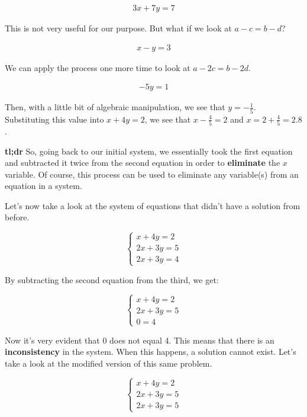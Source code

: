 \documentclass{scrbook}
\theoremstyle{definition}
\begin{document}
\begin{align*}
  3x + 7y = 7
\end{align*}

This is not very useful for our purpose. But what if we look at $a - c = b - d$?

\begin{align*}
  x - y = 3
\end{align*}

We can apply the process one more time to look at $a - 2c = b - 2d$. 

\begin{align*}
  - 5y = 1
\end{align*}

Then, with a little bit of algebraic manipulation, we see that $y = -\frac{1}{5}$. Substituting this value into $x + 4y = 2$, we see that $x - \frac{4}{5} = 2$ and $x = 2 + \frac{4}{5} = 2.8$. 

\textbf{tl;dr} So, going back to our initial system, we essentially took the first equation and subtracted it twice from the second equation in order to \textbf{eliminate} the $x$ variable. Of course, this process can be used to eliminate any variable(s) from an equation in a system. 

Let's now take a look at the system of equations that didn't have a solution from before.

\[
  \begin{cases}
    x + 4y = 2\\
    2x + 3y = 5\\
    2x + 3y = 4
  \end{cases}
\]

By subtracting the second equation from the third, we get:

\[
  \begin{cases}
    x + 4y = 2\\
    2x + 3y = 5\\
    0 = 4
  \end{cases}
\]

Now it's very evident that 0 does not equal 4. This means that there is an \textbf{inconsistency} in the system. When this happens, a solution cannot exist. Let's take a look at the modified version of this same problem.

\[
  \begin{cases}
    x + 4y = 2\\
    2x + 3y = 5\\
    2x + 3y = 5
  \end{cases}
\]
\end{document}
